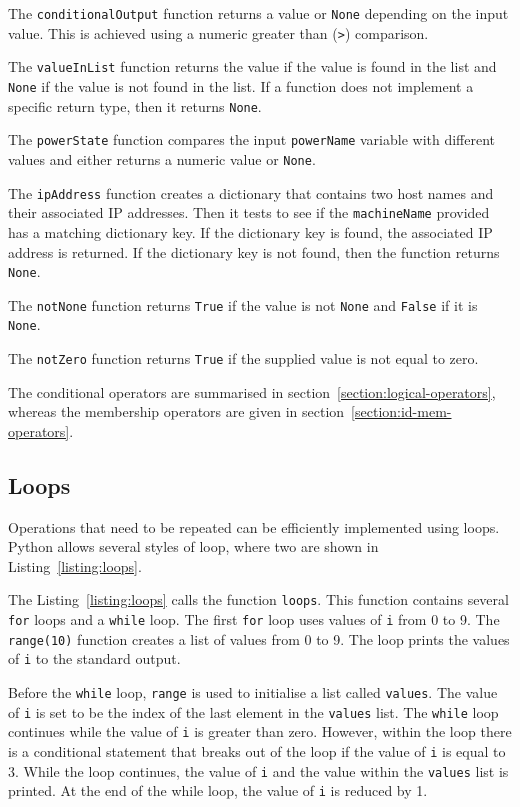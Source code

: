 \documentclass[11pt,a4paper]{article}
\begin{document}
The \texttt{conditionalOutput} function returns a value or \texttt{None} depending on the input value.  This is achieved using a numeric greater than (\texttt{>}) comparison.

The \texttt{valueInList} function returns the value if the value is found in the list and \texttt{None} if the value is not found in the list.  If a function does not implement a specific return type, then it returns \texttt{None}.

The \texttt{powerState} function compares the input \texttt{powerName} variable with different values and either returns a numeric value or \texttt{None}.

The \texttt{ipAddress} function creates a dictionary that contains two host names and their associated IP addresses.  Then it tests to see if the \texttt{machineName} provided has a matching dictionary key.  If the dictionary key is found, the associated IP address is returned.  If the dictionary key is not found, then the function returns \texttt{None}.

The \texttt{notNone} function returns \texttt{True} if the value is not \texttt{None} and \texttt{False} if it is \texttt{None}.

The \texttt{notZero} function returns \texttt{True} if the supplied value is not equal to zero.

The conditional operators are summarised in section~\ref{section:logical-operators}, whereas the membership operators are given in section~\ref{section:id-mem-operators}.

\subsection{Loops}

Operations that need to be repeated can be efficiently implemented using loops.  Python allows several styles of loop, where two are shown in Listing~\ref{listing:loops}.



The Listing~\ref{listing:loops} calls the function \texttt{loops}.  This function contains several \texttt{for} loops and a \texttt{while} loop.  The first \texttt{for} loop uses values of \texttt{i} from 0 to 9.  The \texttt{range(10)} function creates a list of values from 0 to 9.  The loop prints the values of \texttt{i} to the standard output.

Before the \texttt{while} loop, \texttt{range} is used to initialise a list called \texttt{values}.  The value of \texttt{i} is set to be the index of the last element in the \texttt{values} list.  The \texttt{while} loop continues while the value of \texttt{i} is greater than zero.  However, within the loop there is a conditional statement that breaks out of the loop if the value of \texttt{i} is equal to 3.  While the loop continues, the value of \texttt{i} and the value within the \texttt{values} list is printed.  At the end of the while loop, the value of \texttt{i} is reduced by 1.
\end{document}
